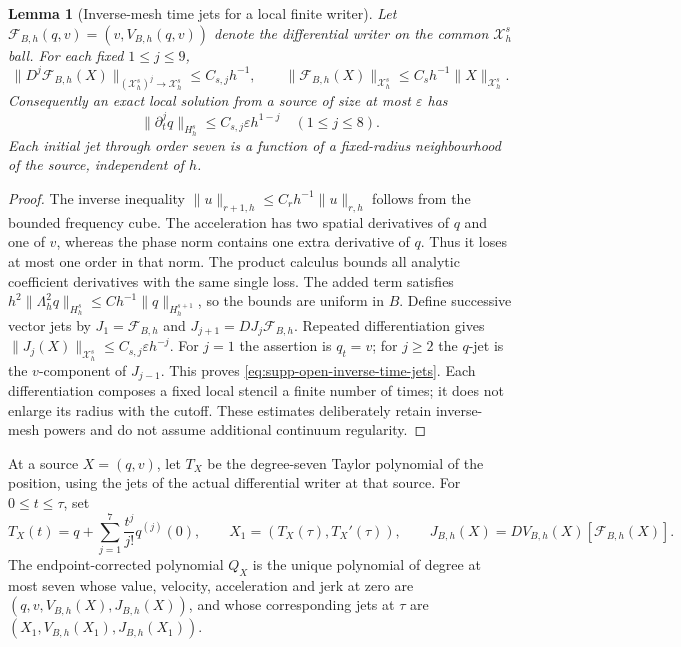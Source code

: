 \documentclass[11pt]{article}
\numberwithin{equation}{section}
\newtheorem{lemma}[lemma]{Lemma}
\theoremstyle{definition}
\theoremstyle{remark}
\begin{document}
\begin{lemma}[Inverse-mesh time jets for a local finite writer]
\label{lem:supp-open-local-jets}
Let $\mathcal F_{B,h}(q,v)=(v,V_{B,h}(q,v))$ denote the differential writer
on the common $\mathcal X_h^s$ ball.  For each fixed $1\le j\le9$,
\begin{equation}
 \|D^j\mathcal F_{B,h}(X)\|_{(\mathcal X_h^s)^j\to\mathcal X_h^s}
 \le C_{s,j}h^{-1},\qquad
 \|\mathcal F_{B,h}(X)\|_{\mathcal X_h^s}
 \le C_sh^{-1}\|X\|_{\mathcal X_h^s}.
 \label{eq:supp-open-local-vector-bounds}
\end{equation}
Consequently an exact local solution from a source of size at most
$\varepsilon$ has
\begin{equation}
 \|\partial_t^j q\|_{H_h^s}\le C_{s,j}\varepsilon h^{1-j}
 \quad(1\le j\le8).
 \label{eq:supp-open-inverse-time-jets}
\end{equation}
Each initial jet through order seven is a function of a fixed-radius
neighbourhood of the source, independent of $h$.
\end{lemma}
\begin{proof}
The inverse inequality
$\|u\|_{r+1,h}\le C_rh^{-1}\|u\|_{r,h}$ follows from the bounded
frequency cube.  The acceleration has two spatial derivatives of $q$ and
one of $v$, whereas the phase norm contains one extra derivative of $q$.
Thus it loses at most one order in that norm.  The product calculus bounds
all analytic coefficient derivatives with the same single loss.  The added
term satisfies
$h^2\|\Lambda_h^2q\|_{H_h^s}\le Ch^{-1}\|q\|_{H_h^{s+1}}$,
so the bounds are uniform in $B$.  Define successive vector jets by
$J_1=\mathcal F_{B,h}$ and $J_{j+1}=DJ_j\mathcal F_{B,h}$.
Repeated differentiation gives
$\|J_j(X)\|_{\mathcal X_h^s}\le C_{s,j}\varepsilon h^{-j}$.
For $j=1$ the assertion is $q_t=v$; for $j\ge2$ the $q$-jet is
the $v$-component of $J_{j-1}$. This proves
\eqref{eq:supp-open-inverse-time-jets}.  Each differentiation composes a
fixed local stencil a finite number of times; it does not enlarge its
radius with the cutoff.  These estimates deliberately retain inverse-mesh
powers and do not assume additional continuum regularity.
\end{proof}

At a source $X=(q,v)$, let $T_X$ be the degree-seven Taylor polynomial of
the position, using the jets of the actual differential writer at that
source.  For $0\le t\le\tau$, set
\begin{equation}
 T_X(t)=q+\sum_{j=1}^7\frac{t^j}{j!}q^{(j)}(0),\qquad
 X_1=(T_X(\tau),T_X'(\tau)),\qquad
 J_{B,h}(X)=D V_{B,h}(X)[\mathcal F_{B,h}(X)].
 \label{eq:supp-open-local-taylor}
\end{equation}
The endpoint-corrected polynomial $Q_X$ is the unique polynomial of degree
at most seven whose value, velocity, acceleration and jerk at zero are
$(q,v,V_{B,h}(X),J_{B,h}(X))$, and whose corresponding jets at $\tau$
are $(X_1,V_{B,h}(X_1),J_{B,h}(X_1))$.
\end{document}
